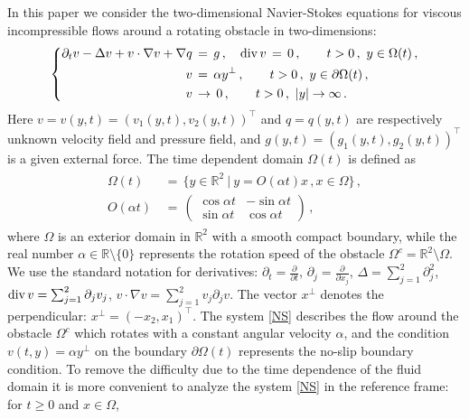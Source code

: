 \documentclass[11pt,a4paper]{article}
\newcommand{\R}{\mathbb{R}}
\begin{document}
In this paper we consider the two-dimensional Navier-Stokes equations for viscous incompressible flows
around a rotating obstacle in two-dimensions:
%
\begin{equation}\label{NS}
  \left\{
\begin{aligned}
 \partial_t v -\Delta v + v\cdot \nabla v + \nabla q & \,=\, g \,,  
 \quad {\rm div}\, v \,=\, 0\,,   ~~~~~~ t>0\,,~y \in \Omega (t)\,, \\
  v & \,=\, \alpha y^\bot \,, ~~~~~~ t>0\,,~ y \in \partial \Omega (t)\,, \\
  v & \, \rightarrow \,     0   \,,  ~~~~~~ t>0\,,~ |y| \rightarrow \infty\,.
\end{aligned}\right.
\end{equation}
%
Here $v=v(y,t) = (v_1(y,t), v_2 (y,t))^\top$ and $q=q(y,t)$ are respectively unknown velocity field and pressure field, and $g(y,t) = (g_1(y,t), g_{2}(y,t))^\top$ is a given external force. 
The time dependent domain $\Omega(t)$ is defined as 
%
\begin{align}
\begin{split}
\Omega(t) & \, = \, \big \{ y\in \R^2~|~ y = O (\alpha t) x\,, x\in \Omega \big \}\,,\\
O (\alpha t ) & \, = \,
\begin{pmatrix}
\cos \alpha t & -\sin \alpha t\\
\sin \alpha t & \cos \alpha t
\end{pmatrix}\,,
\end{split}
\end{align}
%
where $\Omega$ is an exterior domain in $\R^2$ with a smooth compact boundary, while the real number $\alpha \in \R\setminus\{0\}$ represents the rotation speed of the obstacle $\Omega^c=\R^2\setminus\Omega$. 
We use the standard notation for derivatives: $\partial_t = \frac{\partial}{\partial t}$, $\partial_j = \frac{\partial}{\partial x_j}$, $\Delta = \sum_{j=1}^2 \partial^2_j$, ${\rm div}\, v = \sum_{j=1}^2 \partial_j v_j$, $v\cdot \nabla v = \sum_{j=1}^2 v_j \partial_j v$. The vector $x^{\perp}$ denotes the perpendicular: $x^\bot =(-x_2,x_1)^\top$. 
The system \eqref{NS} describes the flow around the obstacle $\Omega^c$ which rotates with a constant angular velocity $\alpha$, and the condition $v (t,y)=\alpha y^\bot$ on the boundary  $\partial \Omega (t)$  represents the no-slip boundary condition. To remove the difficulty due to the time dependence of the fluid domain 
it is more convenient to analyze the system \eqref{NS} in the reference frame: for $t\geq 0$ and $x\in \Omega$,
\end{document}
